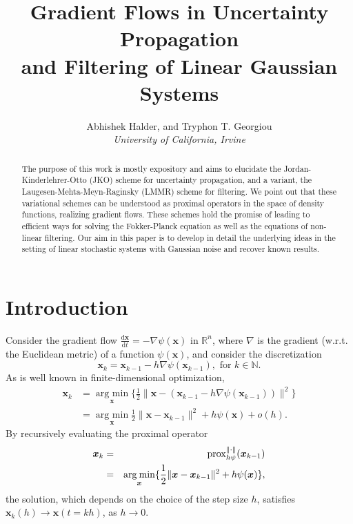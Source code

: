\documentclass[letterpaper,10pt,twocolumn,conference]{ieeeconf}
\newcommand{\mR}{{\mathbb R}}
\newcommand{\bbx}{{\bm{x}}}
\newcommand{\argmin}{\operatorname{arg\:min}}
\begin{document}
\title{Gradient Flows in Uncertainty Propagation\\ and Filtering of Linear Gaussian Systems}
\author{Abhishek Halder, and Tryphon T. Georgiou\\{\em University of California, Irvine}}
\maketitle

\begin{abstract}
The purpose of this work is mostly expository and aims to elucidate the Jordan-Kinderlehrer-Otto (JKO) scheme for uncertainty propagation, and a variant, the Laugesen-Mehta-Meyn-Raginsky (LMMR) scheme for filtering. We point out that these variational schemes can be understood as proximal operators in the space of density functions, realizing gradient flows. These schemes hold the promise of leading to efficient ways for solving the Fokker-Planck equation as well as the equations of non-linear filtering. Our aim in this paper is to develop in detail the underlying ideas in the setting of linear stochastic systems with Gaussian noise and recover known results.
\end{abstract}

\section{Introduction}
Consider the gradient flow
$
\frac{\mathrm{d}\bbx}{\mathrm{d}t}=-\nabla \psi(\bbx)
$
in $\mR^n$, where $\nabla$ is the gradient (w.r.t. the Euclidean metric) of a function $\psi(\bbx)$, and consider the discretization
\[
\bbx_k=\bbx_{k-1}-h \nabla \psi(\bbx_{k-1}), \mbox{ for }k\in\mathbb{N}.
\]
As is well known in finite-dimensional optimization,
\begin{align}
\bbx_{k} &= \underset{\bbx}{\argmin}\{ \frac12\|\bbx - (\bbx_{k-1}-h \nabla \psi(\bbx_{k-1}))\|^2\}\nonumber\\
&=\underset{\bbx}{\argmin} \frac{1}{2}\|\bbx-\bbx_{k-1}\|^2+ h\psi(\bbx) +o(h). \label{eq:jko}
\end{align}
By recursively evaluating the proximal operator \cite{BauschkeCombettes2011, ParikhBoyd2013}
\begin{eqnarray*}
\bbx_{k}&=&{\rm prox}_{h\psi}^{\|\cdot\|}(\bbx_{k-1})\\&=&\underset{\bbx}{\argmin} \{\frac{1}{2}\|\bbx-\bbx_{k-1}\|^2+h\psi(\bbx)\},
\end{eqnarray*}
the solution, which depends on the choice of the step size $h$, satisfies $\bbx_k(h)\to \bbx(t=kh)$, as $h\to 0$.
\end{document}
